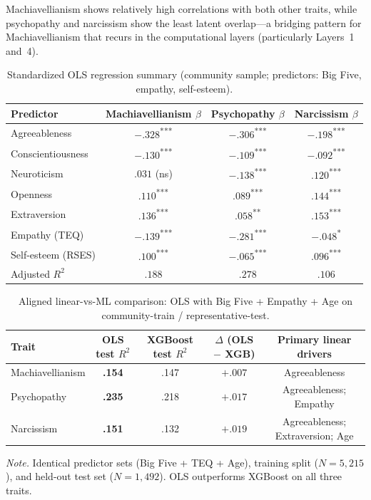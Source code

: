 \documentclass[11pt,twocolumn]{article}
\begin{document}
Machiavellianism shows relatively high correlations with both other traits, while psychopathy and narcissism show the least latent overlap---a bridging pattern for Machiavellianism that recurs in the computational layers (particularly Layers~1 and~4).

\begin{table}[!t]
\centering
\caption{Standardized OLS regression summary (community sample; predictors: Big Five, empathy, self-esteem).}
\label{tab:ols}
\small
\begin{tabular}{lccc}
\toprule
Predictor & Machiavellianism $\beta$ & Psychopathy $\beta$ & Narcissism $\beta$ \\
\midrule
Agreeableness        & $-.328$\textsuperscript{***} & $-.306$\textsuperscript{***} & $-.198$\textsuperscript{***} \\
Conscientiousness    & $-.130$\textsuperscript{***} & $-.109$\textsuperscript{***} & $-.092$\textsuperscript{***} \\
Neuroticism          & $.031$ (ns)                  & $-.138$\textsuperscript{***} & $.120$\textsuperscript{***}  \\
Openness             & $.110$\textsuperscript{***}  & $.089$\textsuperscript{***}  & $.144$\textsuperscript{***}  \\
Extraversion         & $.136$\textsuperscript{***}  & $.058$\textsuperscript{**}   & $.153$\textsuperscript{***}  \\
Empathy (TEQ)        & $-.139$\textsuperscript{***} & $-.281$\textsuperscript{***} & $-.048$\textsuperscript{*}   \\
Self-esteem (RSES)   & $.100$\textsuperscript{***}  & $-.065$\textsuperscript{***} & $.096$\textsuperscript{***}  \\
\midrule
Adjusted $R^2$       & $.188$        & $.278$        & $.106$        \\
\bottomrule
\end{tabular}
\end{table}

\begin{table}[!t]
\centering
\caption{Aligned linear-vs-ML comparison: OLS with Big Five + Empathy + Age on community-train / representative-test.}
\label{tab:ols_ml}
\small
\begin{tabular}{lcccc}
\toprule
Trait & OLS test $R^2$ & XGBoost test $R^2$ & $\Delta$ (OLS $-$ XGB) & Primary linear drivers \\
\midrule
Machiavellianism & \textbf{.154} & .147 & $+.007$ & Agreeableness \\
Psychopathy      & \textbf{.235} & .218 & $+.017$ & Agreeableness; Empathy \\
Narcissism       & \textbf{.151} & .132 & $+.019$ & Agreeableness; Extraversion; Age \\
\bottomrule
\end{tabular}
\par\smallskip
\footnotesize\raggedright
\textit{Note.} Identical predictor sets (Big Five + TEQ + Age), training split ($N = 5{,}215$), and held-out test set ($N = 1{,}492$). OLS outperforms XGBoost on all three traits.
\end{table}
\end{document}
